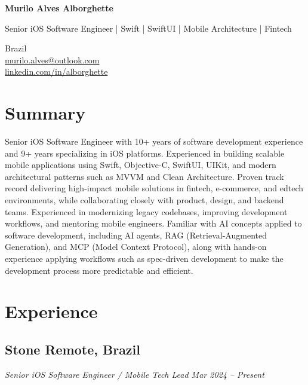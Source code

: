 \documentclass[a4paper,10pt]{article}
\begin{document}
\begin{center}
{\LARGE \textbf{Murilo Alves Alborghette}}

Senior iOS Software Engineer | Swift | SwiftUI | Mobile Architecture | Fintech
\end{center}

Brazil \\
\href{mailto:murilo.alves@outlook.com}{murilo.alves@outlook.com} \\
\href{https://www.linkedin.com/in/alborghette}{linkedin.com/in/alborghette}


\section{Summary}

Senior iOS Software Engineer with 10+ years of software development experience and 9+ years specializing in iOS platforms. Experienced in building scalable mobile applications using Swift, Objective-C, SwiftUI, UIKit, and modern architectural patterns such as MVVM and Clean Architecture. Proven track record delivering high-impact mobile solutions in fintech, e-commerce, and edtech environments, while collaborating closely with product, design, and backend teams. Experienced in modernizing legacy codebases, improving development workflows, and mentoring mobile engineers. Familiar with AI concepts applied to software development, including AI agents, RAG (Retrieval-Augmented Generation), and MCP (Model Context Protocol), along with hands-on experience applying workflows such as spec-driven development to make the development process more predictable and efficient.


\section{Experience}

\subsection*{\textbf{Stone} \hfill Remote, Brazil}
\textit{Senior iOS Software Engineer / Mobile Tech Lead \hfill Mar 2024 – Present}
\end{document}
